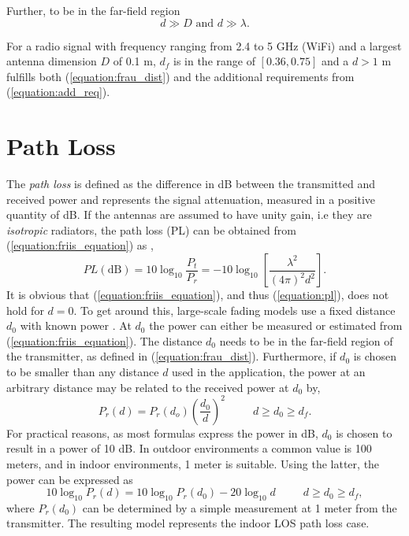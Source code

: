 \documentclass{LTHthesis}
\begin{document}
Further, to be in the far-field region 
\begin{equation}
 d\gg D \mbox{ and } d\gg \lambda.
 \label{equation:add_req}
\end{equation}

For a radio signal with frequency ranging from 2.4 to 5 GHz (WiFi) and a largest antenna dimension $D$ of 0.1 m, $d_f$ is in the
range of $\left[0.36,0.75\right]$  and a $d>1$ m fulfills both  (\ref{equation:frau_dist}) and the additional requirements from (\ref{equation:add_req}).
%
\section{Path Loss}
%
The \emph{path loss} is defined as the difference in dB between the transmitted and received power and represents the signal attenuation, measured in a positive quantity of dB. If the antennas are assumed to have unity gain, i.e they are \emph{isotropic} radiators, the path loss (PL) can be obtained from (\ref{equation:friis_equation}) as \cite{rappaport96}, 
%
\begin{equation}
PL\left(\text{dB}\right)=10\log_{10}{\frac{P_t}{P_r}}=-10\log_{10}{\left[\frac{\lambda^2}{\left(4\pi\right)^2d^2}\right]}\label{equation:pl}.
\end{equation} 
%
It is obvious that (\ref{equation:friis_equation}), and thus (\ref{equation:pl}), does not hold for $d=0$. To get around this, large-scale fading models use a fixed distance $d_0$ with known power \cite{rappaport96}. At $d_0$ the power can either be measured or estimated from (\ref{equation:friis_equation}). The distance $d_0$ needs to be in the far-field region of the transmitter, as defined in (\ref{equation:frau_dist}). Furthermore, if $d_0$ is chosen to be smaller than any distance $d$ used in the application, the power at an arbitrary distance may be related to the received power at $d_0$ by,
%
\begin{equation}
P_r(d)=P_r(d_o)\left(\frac{d_0}{d}\right)^2 \hspace{30pt} d\geq d_0\geq d_f.
\end{equation}
%
For practical reasons, as most formulas express the power in dB, $d_0$ is chosen to result in a power of 10 dB. In outdoor environments a common value is 100 meters, and in indoor environments, 1 meter is suitable. Using the latter, the power can be expressed as
%
\begin{equation}
10\log_{10}{P_r(d)}=10\log_{10}{P_r(d_0)}-20\log_{10}{d} \hspace{30pt} d\geq d_0\geq d_f,
\end{equation}   
%
where $P_r(d_0)$ can be determined by a simple measurement at 1 meter from the transmitter. The resulting model represents the indoor LOS path loss case.
%
\end{document}
